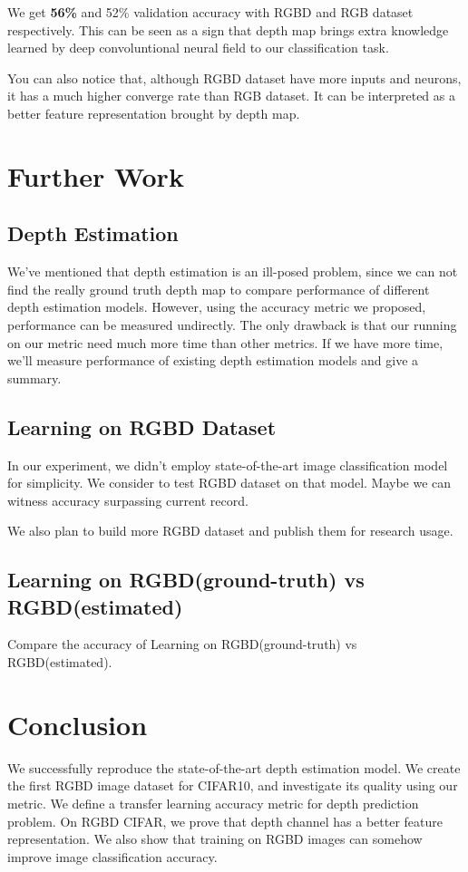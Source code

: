 \documentclass[10pt,twocolumn,letterpaper]{article}
\begin{document}
We get {\bf56\%} and 52\% validation accuracy with RGBD and RGB dataset respectively.
This can be seen as a sign that depth map brings extra knowledge
 learned by deep convoluntional neural field to our classification task.

You can also notice that, although RGBD dataset have more inputs and neurons,
  it has a much higher converge rate than RGB dataset. 
 It can be interpreted as a better feature representation brought by depth map.



\section{Further Work}
\subsection{Depth Estimation}
We\rq{}ve mentioned that depth estimation is an ill-posed problem, 
since we can not find the really ground truth depth map to compare performance of 
different depth estimation models.
However, using the accuracy metric we proposed, performance can be measured 
undirectly.
The only drawback is that our running on our metric need much more time than other metrics.
If we have more time, we\rq{}ll measure performance of existing depth estimation models
 and give a summary.
 
 
\subsection{Learning on RGBD Dataset}
In our experiment, we didn\rq{}t 
employ state-of-the-art image classification model\cite{he2015deep} for simplicity.
We consider to test RGBD dataset on that model. 
Maybe we can witness accuracy surpassing current record.

We also plan to build more RGBD dataset and publish them for research usage.

\subsection{Learning on RGBD(ground-truth) vs RGBD(estimated)}
Compare the accuracy of Learning on RGBD(ground-truth) vs RGBD(estimated).

\section{Conclusion}
We successfully reproduce the state-of-the-art depth estimation model.
We create the first RGBD image dataset for CIFAR10, and investigate its quality 
using our metric.
We define a transfer learning accuracy metric for depth prediction problem.
On RGBD CIFAR, we prove that depth channel has a better feature representation.
We also show that training on RGBD images can somehow improve image 
classification accuracy.
\end{document}
